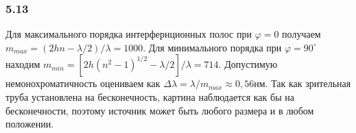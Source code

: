 \subsubsection*{5.13}
Для максимального порядка интерфернционных полос  при $\varphi = 0$ получаем $m_{max} = (2hn - \lambda/2)/\lambda = 1000$. Для минимального порядка при $\varphi = 90^{\circ}$ находим $m_{min} = \left[ 2h(n^2 - 1)^{1/2} - \lambda/2\right] /\lambda = 714$. Допустимую немонохроматичность оцениваем как $\Delta \lambda = \lambda/m_{max} \approx 0,56нм$. Так как зрительная труба установлена на бесконечность, картина наблюдается как бы на бесконечности, поэтому источник может быть любого размера и в любом положении.